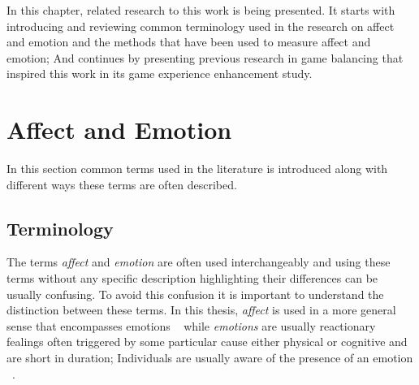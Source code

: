 

In this chapter, related research to this work is being presented. It starts with introducing and reviewing common terminology used in the research on affect and emotion and the methods that have been used to measure affect and emotion; And continues by presenting previous research in game balancing that inspired this work in its game experience enhancement study.

\section{Affect and Emotion}

In this section common terms used in the literature is introduced along with different ways these terms are often described.

\subsection{Terminology}

The terms \textit{affect} and \textit{emotion} are often used interchangeably and using these terms without any specific description highlighting their differences can be usually confusing. To avoid this confusion it is important to understand the distinction between these terms. In this thesis, \textit{affect} is used in a more general sense that encompasses emotions ~\cite{forgas1995mood} while \textit{emotions} are usually reactionary fealings often triggered by some particular cause either physical or cognitive and are short in duration; Individuals are usually aware of the presence of an emotion ~\cite{paiva2007affective}.

